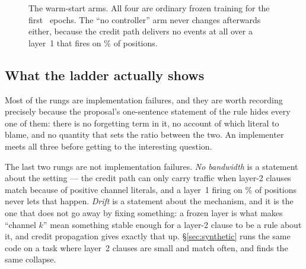 \begin{figure}[h]
\centering
{}
\caption{The warm-start arms. All four are ordinary frozen training for the first
\creditWarmEpochs\ epochs. The ``no controller'' arm never changes afterwards either, because
the credit path delivers no events at all over a layer~1 that fires on \fireGreedyPre{}\% of
positions.}
\label{fig:credit}
\end{figure}

\subsection{What the ladder actually shows}

Most of the rungs are implementation failures, and they are worth recording precisely because
the proposal's one-sentence statement of the rule hides every one of them: there is no
forgetting term in it, no account of which literal to blame, and no quantity that sets the
ratio between the two. An implementer meets all three before getting to the interesting
question.

The last two rungs are not implementation failures. \emph{No bandwidth} is a statement about
the setting --- the credit path can only carry traffic when layer-2 clauses match because of
positive channel literals, and a layer~1 firing on \fireGreedyPre{}\% of positions never lets
that happen. \emph{Drift} is a statement about the mechanism, and it is the one that does not
go away by fixing something: a frozen layer is what makes ``channel $k$'' mean something
stable enough for a layer-2 clause to be a rule about it, and credit propagation gives exactly
that up. \S\ref{sec:synthetic} runs the same code on a task where layer~2 clauses are small
and match often, and finds the same collapse.
